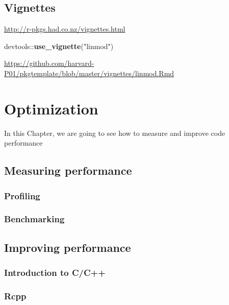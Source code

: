 \documentclass[]{book}
\newenvironment{Shaded}{\begin{snugshade}}{\end{snugshade}}
\newcommand{\KeywordTok}[1]{\textcolor[rgb]{0.13,0.29,0.53}{\textbf{{#1}}}}
\newcommand{\StringTok}[1]{\textcolor[rgb]{0.31,0.60,0.02}{{#1}}}
\newcommand{\NormalTok}[1]{{#1}}
\theoremstyle{definition}
\theoremstyle{definition}
\theoremstyle{definition}
\theoremstyle{remark}
\begin{document}
\section{Vignettes}\label{vignettes}

\url{http://r-pkgs.had.co.nz/vignettes.html}

\begin{Shaded}
\begin{Highlighting}[]
\NormalTok{devtools::}\KeywordTok{use_vignette}\NormalTok{(}\StringTok{"linmod"}\NormalTok{)}
\end{Highlighting}
\end{Shaded}

\url{https://github.com/harvard-P01/pkgtemplate/blob/master/vignettes/linmod.Rmd}

\chapter{Optimization}\label{optimization}

In this Chapter, we are going to see how to measure and improve code
performance

\section{Measuring performance}\label{measuring-performance}

\subsection{Profiling}\label{profiling}

\subsection{Benchmarking}\label{benchmarking}

\section{Improving performance}\label{improving-performance}

\subsection{Introduction to C/C++}\label{introduction-to-cc}

\subsection{Rcpp}\label{rcpp}
\end{document}
